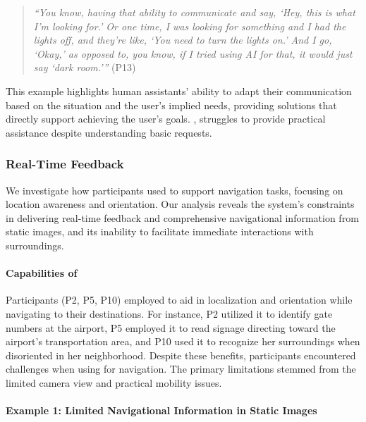 \begin{quote}
    \textit{``You know, having that ability to communicate and say, `Hey, this is what I'm looking for.' Or one time, I was looking for something and I had the lights off, and they're like, `You need to turn the lights on.' And I go, `Okay,' as opposed to, you know, if I tried using AI for that, it would just say `dark room.'''} (P13)
\end{quote}


This example highlights human assistants' ability to adapt their communication based on the situation and the user's implied needs, providing solutions that directly support achieving the user's goals.
% 
, \bma{} struggles to provide practical assistance despite understanding basic requests. 







\subsubsection{Real-Time Feedback}
\label{realtime_feedback}

We investigate how participants used \sbma{} to support navigation tasks, focusing on location awareness and orientation. 
Our analysis reveals the system's constraints in delivering real-time feedback and comprehensive navigational information from static images, and its inability to facilitate immediate interactions with surroundings.  



\paragraph{Capabilities of \bma}

Participants (P2, P5, P10) employed \sbma{} to aid in localization and orientation while navigating to their destinations. 
% 
For instance, P2 utilized it to identify gate numbers at the airport, P5 employed it to read signage directing toward the airport's transportation area, and P10 used it to recognize her surroundings when disoriented in her neighborhood.  
% 
Despite these benefits, participants encountered challenges when using \sbma{} for navigation. The primary limitations stemmed from the limited camera view and practical mobility issues. 




\paragraph{Example 1: Limited Navigational Information in Static Images}


